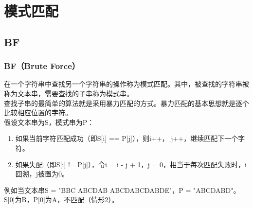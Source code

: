 \chapter{模式匹配}

\section{BF}

\subsection{BF（Brute Force）}

在一个字符串中查找另一个字符串的操作称为模式匹配。其中，被查找的字符串被称为文本串，需要查找的子串称为模式串。 \\

查找子串的最简单的算法就是采用暴力匹配的方式。暴力匹配的基本思想就是逐个比较相应位置的字符。 \\

假设文本串为S，模式串为P：

\begin{enumerate}
	\item 如果当前字符匹配成功（即S[i] == P[j]），则i++， j++，继续匹配下一个字符。

	\item 如果失配（即S[i] != P[j]），令i = i - j + 1，j = 0，相当于每次匹配失败时，i回溯，j被置为0。
\end{enumerate}

例如当文本串S = "BBC ABCDAB ABCDABCDABDE"，P = "ABCDABD"。 \\

S[0]为B，P[0]为A，不匹配（情形2）。

\begin{table}[H]
	\centering
\end{table}

